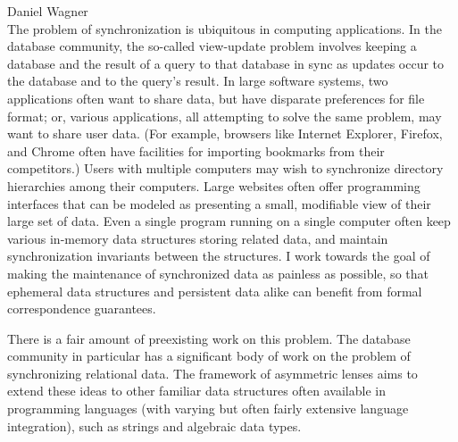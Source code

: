 \documentclass{article}
\begin{document}
{\noindent\large Daniel Wagner}\\[3ex]

The problem of synchronization is ubiquitous in computing applications. In
the database community, the so-called view-update problem involves keeping a
database and the result of a query to that database in sync as updates occur
to the database and to the query's result. In large software systems, two
applications often want to share data, but have disparate preferences for
file format; or, various applications, all attempting to solve the same
problem, may want to share user data. (For example, browsers like Internet
Explorer, Firefox, and Chrome often have facilities for importing bookmarks
from their competitors.) Users with multiple computers may wish to
synchronize directory hierarchies among their computers. Large websites
often offer programming interfaces that can be modeled as presenting a
small, modifiable view of their large set of data. Even a single program
running on a single computer often keep various in-memory data structures
storing related data, and maintain synchronization invariants between the
structures. I work towards the goal of making the maintenance of
synchronized data as painless as possible, so that ephemeral data structures
and persistent data alike can benefit from formal correspondence guarantees.

There is a fair amount of preexisting work on this problem. The database
community in particular has a significant body of work on the problem of
synchronizing relational data. The framework of asymmetric lenses aims to
extend these ideas to other familiar data structures often available in
programming languages (with varying but often fairly extensive language
integration), such as strings and algebraic data types.
\end{document}
